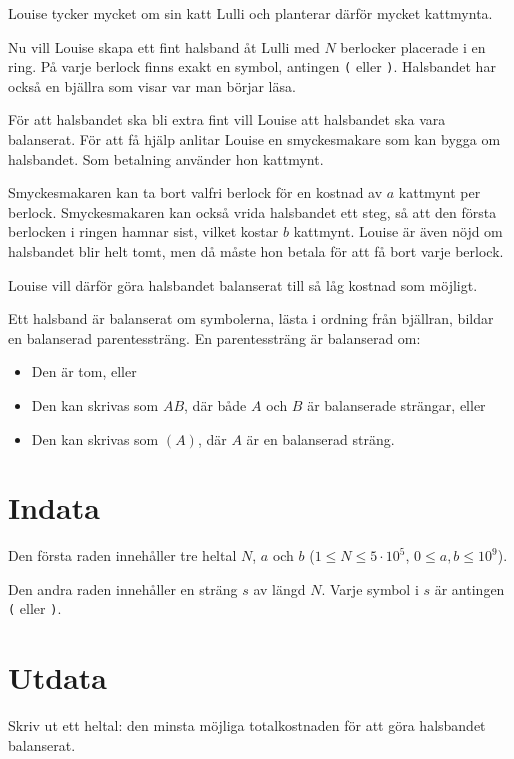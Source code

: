 \noindent


Louise tycker mycket om sin katt Lulli och planterar därför mycket kattmynta.

Nu vill Louise skapa ett fint halsband åt Lulli med $N$ berlocker placerade i en ring.
På varje berlock finns exakt en symbol, antingen \texttt{(} eller \texttt{)}.
Halsbandet har också en bjällra som visar var man börjar läsa.

För att halsbandet ska bli extra fint vill Louise att halsbandet ska vara balanserat.
För att få hjälp anlitar Louise en smyckesmakare som kan bygga om halsbandet. Som betalning använder hon kattmynt.

Smyckesmakaren kan ta bort valfri berlock för en kostnad av $a$ kattmynt per berlock.
Smyckesmakaren kan också vrida halsbandet ett steg, så att den första berlocken i ringen hamnar sist, vilket kostar $b$ kattmynt.
Louise är även nöjd om halsbandet blir helt tomt, men då måste hon betala för att få bort varje berlock.

Louise vill därför göra halsbandet balanserat till så låg kostnad som möjligt.

Ett halsband är balanserat om symbolerna, lästa i ordning från bjällran, bildar en balanserad parentessträng.
En parentessträng är balanserad om:
\begin{itemize}
    \item Den är tom, eller
    \item Den kan skrivas som $AB$, där både $A$ och $B$ är balanserade strängar, eller
    \item Den kan skrivas som $(A)$, där $A$ är en balanserad sträng.
\end{itemize}


\section*{Indata}
Den första raden innehåller tre heltal $N$, $a$ och $b$ ($1 \leq N \leq 5 \cdot 10^5$, $0 \leq a,b \leq 10^9$).

Den andra raden innehåller en sträng $s$ av längd $N$.
Varje symbol i $s$ är antingen \texttt{(} eller \texttt{)}.

\section*{Utdata}
Skriv ut ett heltal: den minsta möjliga totalkostnaden för att göra halsbandet balanserat.


